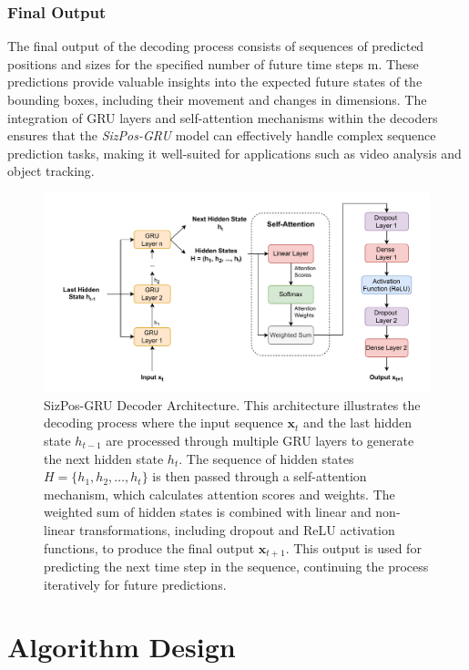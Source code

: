 \documentclass[12pt,oneside]{book} %
\begin{document}
\subsubsection*{Final Output}
\noindent The final output of the decoding process consists of sequences of predicted
positions and sizes for the specified number of future time steps m. These
predictions provide valuable insights into the expected future states of the
bounding boxes, including their movement and changes in dimensions. The
integration of GRU layers and self-attention mechanisms within the decoders
ensures that the \textit{SizPos-GRU} model can effectively handle complex
sequence prediction tasks, making it well-suited for applications such as video
analysis and object tracking.

\begin{figure}[H]
    \centering
    \includegraphics[width=1\textwidth]{figures/GRUSizPosDecoder.drawio.pdf}
    \caption{SizPos-GRU Decoder Architecture. This architecture illustrates the decoding process where the input sequence \( \mathbf{x}_t \) and the last hidden state \( h_{t-1} \) are processed through multiple GRU layers to generate the next hidden state \( h_t \). The sequence of hidden states \( H = \{h_1, h_2, \dots, h_t\} \) is then passed through a self-attention mechanism, which calculates attention scores and weights. The weighted sum of hidden states is combined with linear and non-linear transformations, including dropout and ReLU activation functions, to produce the final output \( \mathbf{x}_{t+1} \). This output is used for predicting the next time step in the sequence, continuing the process iteratively for future predictions.}
    \label{fig:sizpos-gru-decoder}
\end{figure}

\newpage
\section{Algorithm Design}
\end{document}
